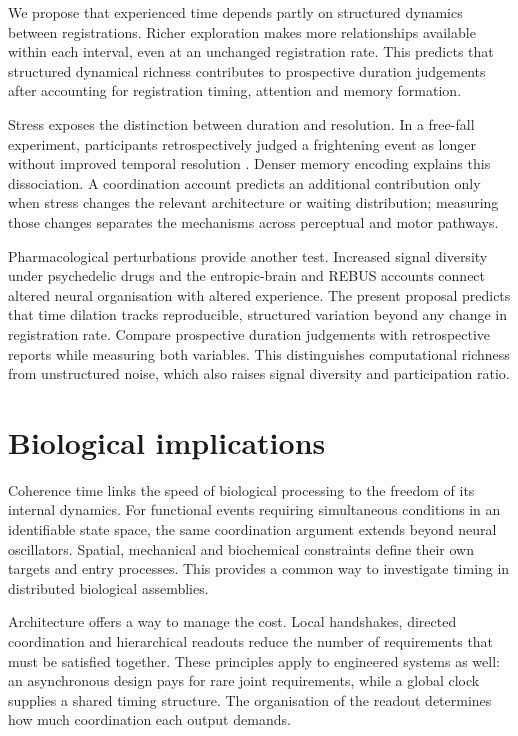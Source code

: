 \documentclass[11pt]{article}
\begin{document}
We propose that experienced time depends partly on structured dynamics
between registrations. Richer exploration makes more relationships
available within each interval, even at an unchanged registration rate.
This predicts that structured dynamical richness contributes to prospective
duration judgements after accounting for registration timing, attention
and memory formation.

Stress exposes the distinction between duration and resolution. In a
free-fall experiment, participants retrospectively judged a frightening
event as longer without improved temporal resolution \cite{stetson2007}.
Denser memory encoding explains this dissociation. A coordination account
predicts an additional contribution only when stress changes the relevant
architecture or waiting distribution; measuring those changes separates
the mechanisms across perceptual and motor pathways.

Pharmacological perturbations provide another test. Increased signal
diversity under psychedelic drugs \cite{schartner2017,timmermann2019}
and the entropic-brain and REBUS accounts \cite{carhart2014,carhart2019rebus}
connect altered neural organisation with altered experience. The present
proposal predicts that time dilation tracks reproducible, structured
variation beyond any change in registration rate. Compare prospective
duration judgements with retrospective reports while measuring both
variables. This distinguishes computational richness from unstructured
noise, which also raises signal diversity and participation ratio.

\section{Biological implications}

Coherence time links the speed of biological processing to the freedom of
its internal dynamics. For functional events requiring simultaneous
conditions in an identifiable state space, the same coordination argument
extends beyond neural oscillators. Spatial, mechanical and biochemical
constraints define their own targets and entry processes. This provides a
common way to investigate timing in distributed biological assemblies.

Architecture offers a way to manage the cost. Local handshakes, directed
coordination and hierarchical readouts reduce the number of requirements
that must be satisfied together. These principles apply to engineered
systems as well: an asynchronous design pays for rare joint requirements,
while a global clock supplies a shared timing structure. The organisation
of the readout determines how much coordination each output demands.
\end{document}

